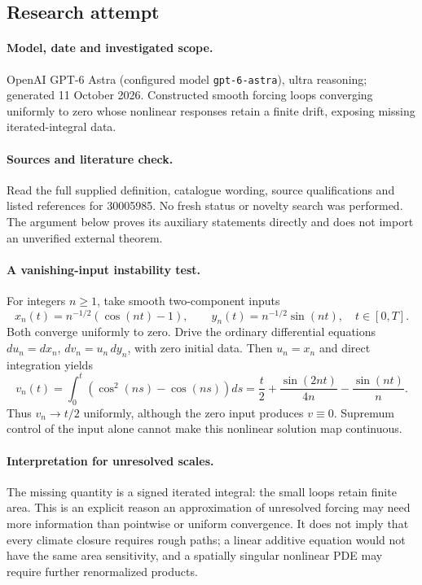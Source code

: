 \documentclass[11pt]{article}
\begin{document}
\subsection{Research attempt}
\paragraph{Model, date and investigated scope.}
OpenAI GPT-6 Astra (configured model \texttt{gpt-6-astra}), ultra reasoning; generated 11 October 2026. Constructed smooth forcing loops converging uniformly to zero whose nonlinear responses retain a finite drift, exposing missing iterated-integral data.

\paragraph{Sources and literature check.}
Read the full supplied definition, catalogue wording, source qualifications and listed references for 30005985. No fresh status or novelty search was performed. The argument below proves its auxiliary statements directly and does not import an unverified external theorem.

\paragraph{A vanishing-input instability test.} For integers \(n\geq1\), take smooth two-component inputs
\[
 x_n(t)=n^{-1/2}(\cos(nt)-1),\qquad y_n(t)=n^{-1/2}\sin(nt),\quad t\in[0,T].
\]
Both converge uniformly to zero. Drive the ordinary differential equations \(du_n=dx_n\), \(dv_n=u_n\,dy_n\), with zero initial data. Then \(u_n=x_n\) and direct integration yields
\[
 v_n(t)=\int_0^t(\cos^2(ns)-\cos(ns))ds
 =\frac t2+\frac{\sin(2nt)}{4n}-\frac{\sin(nt)}n.
\]
Thus \(v_n\to t/2\) uniformly, although the zero input produces \(v\equiv0\). Supremum control of the input alone cannot make this nonlinear solution map continuous.
\paragraph{Interpretation for unresolved scales.} The missing quantity is a signed iterated integral: the small loops retain finite area. This is an explicit reason an approximation of unresolved forcing may need more information than pointwise or uniform convergence. It does not imply that every climate closure requires rough paths; a linear additive equation would not have the same area sensitivity, and a spatially singular nonlinear PDE may require further renormalized products.
\end{document}
